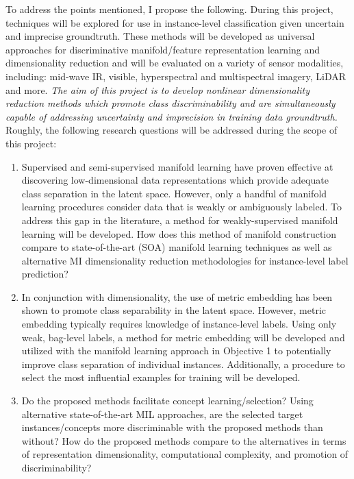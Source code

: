 To address the points mentioned, I propose the following.  During this project, techniques will be explored for use in instance-level classification given uncertain and imprecise groundtruth.  These methods will be developed as universal approaches for discriminative manifold/feature representation learning and dimensionality reduction and will be evaluated on a variety of sensor modalities, including: mid-wave IR, visible, hyperspectral and multispectral imagery, LiDAR and more.  \textit{The aim of this project is to develop nonlinear dimensionality reduction methods which promote class discriminability and are simultaneously capable of addressing uncertainty and imprecision in training data groundtruth.} Roughly, the following research questions will be addressed during the scope of this project:
\begin{enumerate}
	\item Supervised and semi-supervised manifold learning have proven effective at discovering low-dimensional data representations which provide adequate class separation in the latent space.  However, only a handful of manifold learning procedures consider data that is weakly or ambiguously labeled.  To address this gap in the literature, a method for weakly-supervised manifold learning will be developed. How does this method of manifold construction compare to state-of-the-art (SOA) manifold learning techniques as well as alternative MI dimensionality reduction methodologies for instance-level label prediction?
	\item In conjunction with dimensionality, the use of metric embedding has been shown to promote class separability in the latent space. However, metric embedding typically requires knowledge of instance-level labels.  Using only weak, bag-level labels, a method for metric embedding will be developed and utilized with the manifold learning approach in Objective 1 to potentially improve class separation of individual instances.  Additionally, a procedure to select the most influential examples for training will be developed.
	\item Do the proposed methods facilitate concept learning/selection?  Using alternative state-of-the-art MIL approaches, are the selected target instances/concepts more discriminable with the proposed methods than without?  How do the proposed methods compare to the alternatives in terms of representation dimensionality, computational complexity, and promotion of discriminability?
\end{enumerate} 

